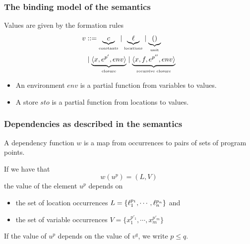 \documentclass{beamer}
\begin{document}
  \newcommand{\desc}[2]{\ensuremath{\underbrace{#1}_{\text{\tiny{#2}}}}}

\begin{frame}
  \frametitle{The binding model of the semantics}

  Values are given by the formation rules
%
  \begin{align*}
    v & ::= \desc{c}{constants} \mid \desc{\ell}{locations} \mid
        \desc{()}{unit} \\
    & \mid  \desc{\langle x,e^{p'},env\rangle}{closure} \mid
      \desc{\langle x,f,e^{p''},env\rangle}{recursive closure}
   \end{align*}

   \begin{itemize}
   \item An environment $env$ is a partial function from variables to values.
\item A store $sto$ is a partial function from locations to values.
   \end{itemize}

\end{frame}
\begin{frame} \frametitle{Dependencies as described in the semantics}

  A dependency function $w$ is a map from occurrences to pairs of sets
  of program points.
  
  If we have that
\[ w (u^p)=(L,V) \]
%
the value of the element $u^p$ depends on
\begin{itemize}
\item the set of location occurrences
  $L=\{\ell_1^{p_1},\cdots,\ell_n^{p_n}\}$ and
\item the set of variable occurrences $V =\{x_1^{p'_1},\cdots,x_m^{p'_m}\}$

\end{itemize}

If the value of $u^p$ depends on the value of $v^q$, we write $p \leq q$.
\end{frame}



\end{document}
